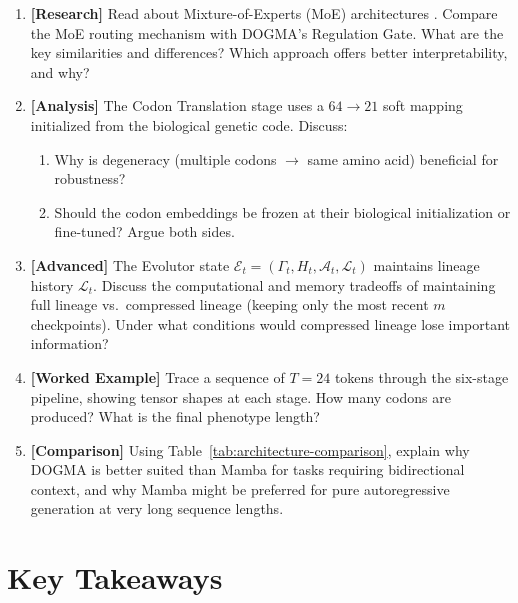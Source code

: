 \begin{enumerate}[label=\textbf{7.\arabic*.}, leftmargin=2.5em]
\item \textbf{[Research]} Read about Mixture-of-Experts (MoE) architectures \citep{brown2020}. Compare the MoE routing mechanism with DOGMA's Regulation Gate. What are the key similarities and differences? Which approach offers better interpretability, and why?

\item \textbf{[Analysis]} The Codon Translation stage uses a $64 \to 21$ soft mapping initialized from the biological genetic code. Discuss:
\begin{enumerate}[label=(\alph*)]
  \item Why is degeneracy (multiple codons $\to$ same amino acid) beneficial for robustness?
  \item Should the codon embeddings be frozen at their biological initialization or fine-tuned? Argue both sides.
\end{enumerate}

\item \textbf{[Advanced]} The Evolutor state $\mathcal{E}_t = (\Gamma_t, H_t, \mathcal{A}_t, \mathcal{L}_t)$ maintains lineage history $\mathcal{L}_t$. Discuss the computational and memory tradeoffs of maintaining full lineage vs.\ compressed lineage (keeping only the most recent $m$ checkpoints). Under what conditions would compressed lineage lose important information?

\item \textbf{[Worked Example]} Trace a sequence of $T = 24$ tokens through the six-stage pipeline, showing tensor shapes at each stage. How many codons are produced? What is the final phenotype length?

\item \textbf{[Comparison]} Using Table~\ref{tab:architecture-comparison}, explain why DOGMA is better suited than Mamba for tasks requiring bidirectional context, and why Mamba might be preferred for pure autoregressive generation at very long sequence lengths.
\end{enumerate}

\section{Key Takeaways}


